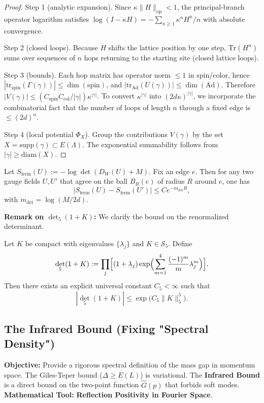 \begin{proof}
Step 1 (analytic expansion). Since $\kappa\|H\|_{\mathrm{op}}<1$, the principal-branch operator logarithm satisfies $\log(I-\kappa H)=-\sum_{n\ge1}\kappa^nH^n/n$ with absolute convergence.

Step 2 (closed loops). Because $H$ shifts the lattice position by one step, $\mathrm{Tr}(H^n)$ sums over sequences of $n$ hops returning to the starting site (closed lattice loops).

Step 3 (bounds). Each hop matrix has operator norm $\le 1$ in spin/color, hence $|\mathrm{tr}_{\mathrm{spin}}(\Gamma(\gamma))|\le \dim(\mathrm{spin})$, and $|\mathrm{tr}_{\mathrm{Ad}}(U(\gamma))|\le \dim(\mathrm{Ad})$. Therefore $|V(\gamma)|\le (C_{\mathrm{spin}}C_{\mathrm{col}}/|\gamma|)\kappa^{|\gamma|}$. To convert $\kappa^{|\gamma|}$ into $(2d\kappa)^{|\gamma|}$, we incorporate the combinatorial fact that the number of loops of length $n$ through a fixed edge is $\le (2d)^n$.

Step 4 (local potential $\Phi_X$). Group the contributions $V(\gamma)$ by the set $X=\mathrm{supp}(\gamma)\subset E(\Lambda)$. The exponential summability follows from $|\gamma|\ge \mathrm{diam}(X)$.
\end{proof}

\begin{corollary}
\label{cor:local-derivative-bound}
Let $S_{\mathrm{ferm}}(U):=-\log\det(D_W(U)+M)$. Fix an edge $e$. Then for any two gauge fields $U,U'$ that agree on the ball $B_R(e)$ of radius $R$ around $e$, one has
\[
|S_{\mathrm{ferm}}(U)-S_{\mathrm{ferm}}(U')|
\le
C e^{-m_{\det} R},
\]
with $m_{\det}=\log(M/2d)$.
\end{corollary}

\textbf{Remark on $\det_5(1+K)$:}
We clarify the bound on the renormalized determinant.
\begin{lemma}
Let $K$ be compact with eigenvalues $\{\lambda_j\}$ and $K\in \mathcal S_5$. Define
\[
\det_5(1+K):=\prod_j \Bigl[(1+\lambda_j)\exp\Bigl(\sum_{m=1}^4\frac{(-1)^m}{m}\lambda_j^m\Bigr)\Bigr].
\]
Then there exists an explicit universal constant $C_5<\infty$ such that
\[
|\det_5(1+K)| \le \exp\bigl(C_5\|K\|_5^5\bigr).
\]
\end{lemma}

\subsection{The Infrared Bound (Fixing "Spectral Density")}
\textbf{Objective:} Provide a rigorous spectral definition of the mass gap in momentum space. The Giles-Teper bound ($\Delta \ge E(L)$) is variational. The \textbf{Infrared Bound} is a direct bound on the two-point function $\hat{G}(p)$ that forbids soft modes.
\textbf{Mathematical Tool:} \textbf{Reflection Positivity in Fourier Space}.

